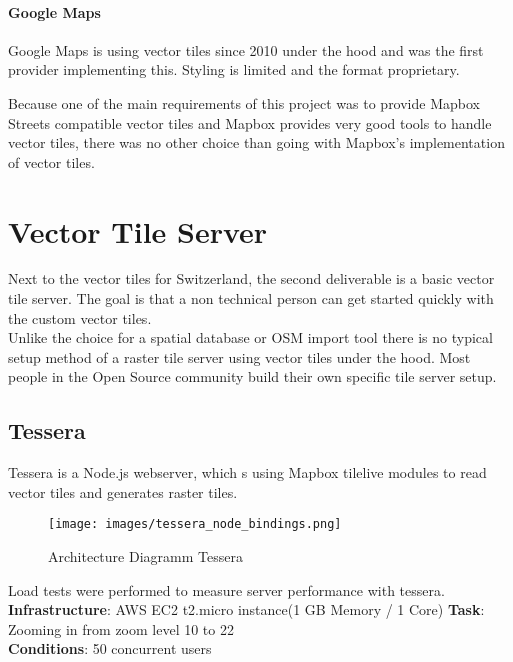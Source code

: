 \paragraph{Google Maps}

Google Maps is using vector tiles since 2010 under the hood and was the
first provider implementing this. Styling is limited and the format
proprietary.


\begin{tcolorbox}[arc=0mm,boxrule=1pt,title=Decision]\label{vector_tile_spec_impl_decision}
Because one of the main requirements of this project was to provide Mapbox Streets compatible vector tiles and Mapbox provides very good tools to handle vector tiles, there was no other choice than going with Mapbox's implementation of vector tiles.
\end{tcolorbox}

\section{Vector Tile Server}\label{vector_tile_server}

Next to the vector tiles for Switzerland, the second deliverable is a basic vector tile server. The goal is that a non technical person can get started quickly with the custom vector tiles.\\

Unlike the choice for a spatial database or OSM import tool
there is no typical setup method of a raster tile server using vector tiles under the hood. Most people in the Open Source community build their own specific tile server setup.

\subsection{Tessera}\label{tessera}

Tessera\cite{13_github_2015} is a Node.js\cite{14_foundation_2015} webserver, which s using Mapbox tilelive\cite{15_github_2015} modules to read vector tiles and generates raster tiles.

\begin{figure}[H]
\centering
  \texttt{[image: images/tessera\_node\_bindings.png]}
  \caption{Architecture Diagramm Tessera}
\end{figure}

Load tests were performed to measure server performance with tessera.
\\
\textbf{Infrastructure}: AWS EC2 t2.micro instance(1 GB Memory / 1 Core)
\textbf{Task}: Zooming in from zoom level 10 to 22 \\
\textbf{Conditions}: 50 concurrent users \\

